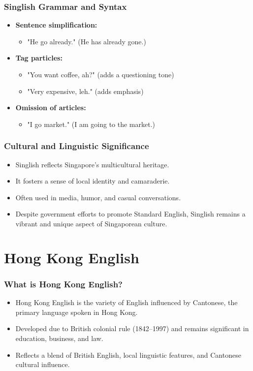\documentclass{beamer}
\begin{document}
\begin{frame}
\frametitle{Singlish Grammar and Syntax}
\begin{itemize}
    \item \textbf{Sentence simplification:}
    \begin{itemize}
        \item "He go already." (He has already gone.)
    \end{itemize}
    \item \textbf{Tag particles:}
    \begin{itemize}
        \item "You want coffee, ah?" (adds a questioning tone)
        \item "Very expensive, leh." (adds emphasis)
    \end{itemize}
    \item \textbf{Omission of articles:}
    \begin{itemize}
        \item "I go market." (I am going to the market.)
    \end{itemize}
\end{itemize}
\end{frame}

\begin{frame}
\frametitle{Cultural and Linguistic Significance}
\begin{itemize}
    \item Singlish reflects Singapore’s multicultural heritage.
    \item It fosters a sense of local identity and camaraderie.
    \item Often used in media, humor, and casual conversations.
    \item Despite government efforts to promote Standard English, Singlish remains a vibrant and unique aspect of Singaporean culture.
\end{itemize}
\end{frame}


\section{Hong Kong English}



\begin{frame}
\frametitle{What is Hong Kong English?}
\begin{itemize}
    \item Hong Kong English is the variety of English influenced by Cantonese, the primary language spoken in Hong Kong.
    \item Developed due to British colonial rule (1842–1997) and remains significant in education, business, and law.
    \item Reflects a blend of British English, local linguistic features, and Cantonese cultural influence.
\end{itemize}
\end{frame}
\end{document}
